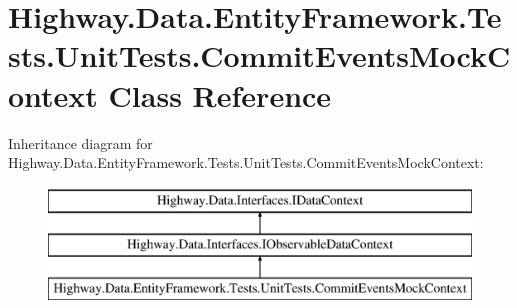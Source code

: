\hypertarget{class_highway_1_1_data_1_1_entity_framework_1_1_tests_1_1_unit_tests_1_1_commit_events_mock_context}{\section{Highway.\-Data.\-Entity\-Framework.\-Tests.\-Unit\-Tests.\-Commit\-Events\-Mock\-Context Class Reference}
\label{class_highway_1_1_data_1_1_entity_framework_1_1_tests_1_1_unit_tests_1_1_commit_events_mock_context}
}
Inheritance diagram for Highway.\-Data.\-Entity\-Framework.\-Tests.\-Unit\-Tests.\-Commit\-Events\-Mock\-Context\-:\begin{figure}[H]
\begin{center}
\leavevmode
\includegraphics[height=3.000000cm]{class_highway_1_1_data_1_1_entity_framework_1_1_tests_1_1_unit_tests_1_1_commit_events_mock_context}
\end{center}
\end{figure}
